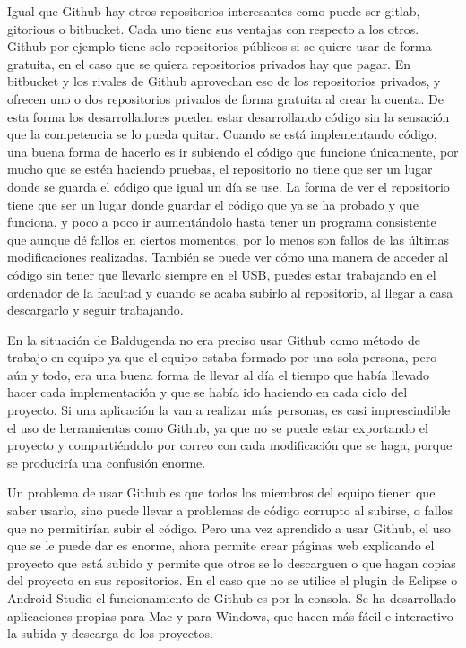 Igual que Github hay otros repositorios interesantes como puede ser gitlab, gitorious o bitbucket.
Cada uno tiene sus ventajas con respecto a los otros. Github por ejemplo tiene solo repositorios públicos si se quiere usar de forma gratuita, en el caso que se quiera repositorios privados hay que pagar.
En bitbucket y los rivales de Github aprovechan eso de los repositorios privados, y ofrecen uno o dos repositorios privados de forma gratuita al crear la cuenta.
De esta forma los desarrolladores pueden estar desarrollando código sin la sensación que la competencia se lo pueda quitar.
Cuando se está implementando código, una buena forma de hacerlo es ir subiendo el código que funcione únicamente, por mucho que se estén haciendo pruebas, el repositorio no tiene que ser un lugar donde se guarda el código que igual un día se use.
La forma de ver el repositorio tiene que ser un lugar donde guardar el código que ya se ha probado y que funciona, y poco a poco ir aumentándolo hasta tener un programa consistente que aunque dé fallos en ciertos momentos, por lo menos son fallos de las últimas modificaciones realizadas.
También se puede ver cómo una manera de acceder al código sin tener que llevarlo siempre en el USB, puedes estar trabajando en el ordenador de la facultad y cuando se acaba subirlo al repositorio, al llegar a casa descargarlo y seguir trabajando.

En la situación de Baldugenda no era preciso usar Github como método de trabajo en equipo ya que el equipo estaba formado por una sola persona, pero aún y todo, era una buena forma de llevar al día el tiempo que había llevado hacer cada implementación y que se había ido haciendo en cada ciclo del proyecto.
Si una aplicación la van a realizar más personas, es casi imprescindible el uso de herramientas como Github, ya que no se puede estar exportando el proyecto y compartiéndolo por correo con cada modificación que se haga, porque se produciría una confusión enorme.

Un problema de usar Github es que todos los miembros del equipo tienen que saber usarlo, sino puede llevar a problemas de código corrupto al subirse, o fallos que no permitirían subir el código. Pero una vez aprendido a usar Github, el uso que se le puede dar es enorme, ahora permite crear páginas web explicando el proyecto que está subido y permite que otros se lo descarguen o que hagan copias del proyecto en sus repositorios.
En el caso que no se utilice el plugin de Eclipse o Android Studio el funcionamiento de Github es por la consola. Se ha desarrollado aplicaciones propias para Mac  y para Windows, que hacen más fácil e interactivo la subida y descarga de los proyectos.

